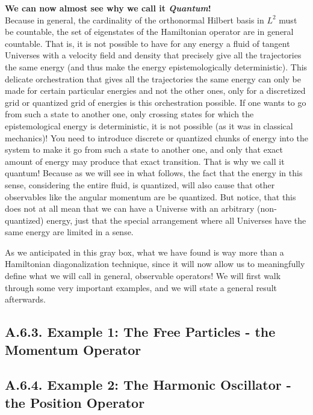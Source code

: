 \documentclass[11pt, a4paper]{article} %
\DeclareRobustCommand{\mybox}[2][gray!10]{%
\begin{tcolorbox}[   %
        left=0.2cm,
        right=0.2cm,
        top=0.15cm,
        bottom=0.15cm,
        colback=#1,
        colframe=#1,
        width=\dimexpr\textwidth\relax, 
        enlarge left by=0mm,
        boxsep=5pt,
        arc=0pt,outer arc=0pt,
        ]
        #2
\end{tcolorbox}
}
\begin{document}
\mybox{
{\bf We can now almost see why we call it {\em Quantum}!\\ }
Because in general, the cardinality of the orthonormal Hilbert basis in $L^2$ must be countable, the set of eigenstates of the Hamiltonian operator are in general countable. That is, it is not possible to have for any energy a fluid of tangent Universes with a velocity field and density that precisely give all the trajectories the same energy (and thus make the energy epistemologically deterministic). This delicate orchestration that gives all the trajectories the same energy can only be made for certain particular energies and not the other ones, only for a discretized grid or quantized grid of energies is this orchestration possible. If one wants to go from such a state to another one, only crossing states for which the epistemological energy is deterministic, it is not possible (as it was in classical mechanics)! You need to introduce discrete or quantized chunks of energy into the system to make it go from such a state to another one, and only that exact amount of energy may produce that exact transition. That is why we call it quantum! Because as we will see in what follows, the fact that the energy in this sense, considering the entire fluid, is quantized, will also cause that other observables like the angular momentum are be quantized. But notice, that this does not at all mean that we can have a Universe with an arbitrary (non-quantized) energy, just that the special arrangement where all Universes have the same energy are limited in a sense.
}



As we anticipated in this gray box, what we have found is way more than a Hamiltonian diagonalization technique, since it will now allow us to meaningfully define what we will call in general, observable operators! We will first walk through some very important examples, and we will state a general result afterwards.



\subsection*{A.6.3. Example 1: The Free Particles - the Momentum Operator}

\subsection*{A.6.4. Example 2: The Harmonic Oscillator - the Position Operator}
\end{document}

